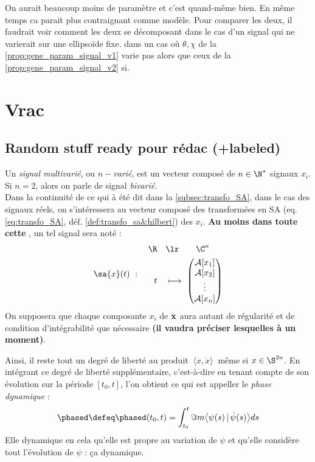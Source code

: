 On aurait beaucoup moins de paramètre et c'est quand-même bien. En même temps ca parait plus contraignant comme modèle. Pour comparer les deux, il faudrait voir comment les deux se décomposant dans le cas d'un signal qui ne varierait sur une ellipsoïde fixe. \ie dans un cas où $\theta,\chi$ de la \cref{prop:gene_param_signal_v1} varie pas alors que ceux de la \cref{prop:gene_param_signal_v2} si.



\section{Vrac}

\subsection{Random  stuff ready pour rédac (+labeled)}

\begin{definition}\label{def:signal_multivar}
	Un \emph{signal multivarié}, ou \emph{$n-$varié}, est un vecteur composé de $n\in\N^*$ signaux $x_i$. Si $n=2$, alors on parle de signal \emph{bivarié}.
	\\
	Dans la continuité de ce qui à été dit dans la \cref{subsec:transfo_SA}, dans le cas des signaux réels, on s'intéressera au vecteur composé des transformées en SA (eq. \ref{eq:transfo_SA}, déf. \ref{def:transfo_sa&hilbert}) des $x_i$.
	\textbf{Au moins dans toute cette }, un tel signal sera noté :
	\[\sa{x}(t)\ :\quad \begin{aligned} 
		\R\quad &\lr\qquad \C^n \\t\quad &\longmapsto\ \begin{pmatrix} \mathcal{A}[x_1] \\ 
			\mathcal{A}[x_2] \\ \vdots \\ \mathcal{A}[x_n] \end{pmatrix}
	\end{aligned} \]
	On supposera que chaque composante $x_i$ de $\bf{x}$ aura autant de régularité et de condition d'intégrabilité que nécessaire \textbf{(il vaudra préciser lesquelles à un moment)}.
\end{definition}

\begin{definition}\label{def:phase_dyn}
	Ainsi, il reste tout un degré de liberté au produit $\ \langle x, \dot{x} \rangle\ $ même si $x\in\S^{2n}$. En intégrant ce degré de liberté supplémentaire, c'est-à-dire en tenant compte de son évolution sur la période $[t_0,t]$, l'on obtient ce qui est appeller le \emph{phase dynamique} :
	\[\phased \defeq \phased(t_0,t) = \int_{t_0}^t \Im m \big\langle \psi(s) \, |\, \dot{\psi}(s) \big\rangle ds\]
	Elle dynamique en cela qu'elle est propre au variation de $\psi$ et qu'elle considère tout l'évolution de $\psi$ : ça dynamique.
\end{definition}



